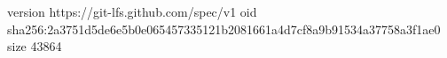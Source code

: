 version https://git-lfs.github.com/spec/v1
oid sha256:2a3751d5de6e5b0e065457335121b2081661a4d7cf8a9b91534a37758a3f1ae0
size 43864

